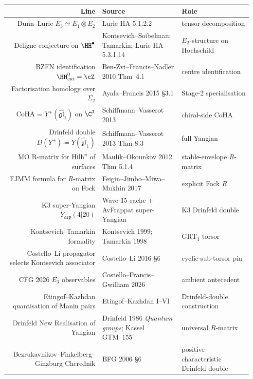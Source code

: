 \begin{center}
\renewcommand{\arraystretch}{1.3}
\small
\begin{tabular}{rll}
 \toprule
 \textbf{Line} & \textbf{Source} & \textbf{Role} \\
 \midrule
 Dunn--Lurie $E_3 \simeq E_1 \otimes E_2$ &
 Lurie HA 5.1.2.2 & tensor decomposition \\
 Deligne conjecture on $\HH^\bullet$ &
 Kontsevich--Soibelman; Tamarkin; Lurie HA 5.3.1.14 &
 $E_2$-structure on Hochschild \\
 BZFN identification $\HH^0_{\mathrm{cat}} = \cZ$ &
 Ben-Zvi--Francis--Nadler 2010 Thm~4.1 & centre identification \\
 Factorisation homology over $\Sigma_2$ &
 Ayala--Francis 2015 \S 3.1 & Stage-2 specialisation \\
 CoHA = $Y^+(\widehat{\mathfrak{gl}}_1)$ on $\C^3$ &
 Schiffmann--Vasserot 2013 & chiral-side CoHA \\
 Drinfeld double $D(Y^+) = Y(\widehat{\mathfrak{gl}}_1)$ &
 Schiffmann--Vasserot 2013 Thm 8.3 & full Yangian \\
 MO R-matrix for $\mathrm{Hilb}^n$ of surfaces &
 Maulik--Okounkov 2012 Thm 5.1.4 & stable-envelope $R$-matrix \\
 FJMM formula for $R$-matrix on Fock &
 Feigin--Jimbo--Miwa--Mukhin 2017 & explicit Fock $R$ \\
 K3 super-Yangian $Y_{\mathfrak{osp}}(4|20)$ &
 Wave-15 cache + AvFrappat super-Yangian & K3 Drinfeld double \\
 Kontsevich--Tamarkin formality &
 Kontsevich 1999; Tamarkin 1998 & $\mathrm{GRT}_1$ torsor \\
 Costello--Li propagator selects Kontsevich associator &
 Costello--Li 2016 \S 6 & cyclic-sub-torsor pin \\
 CFG 2026 $E_3$ observables &
 Costello--Francis--Gwilliam 2026 & ambient antecedent \\
 Etingof--Kazhdan quantisation of Manin pairs &
 Etingof--Kazhdan I--VI & Drinfeld-double
 construction \\
 Drinfeld New Realisation of Yangian &
 Drinfeld 1986 \emph{Quantum groups}; Kassel GTM~155 &
 universal $R$-matrix \\
 Bezrukavnikov--Finkelberg--Ginzburg Cherednik &
 BFG 2006 \S 6 &
 positive-characteristic Drinfeld double \\
 \bottomrule
\end{tabular}
\end{center}


